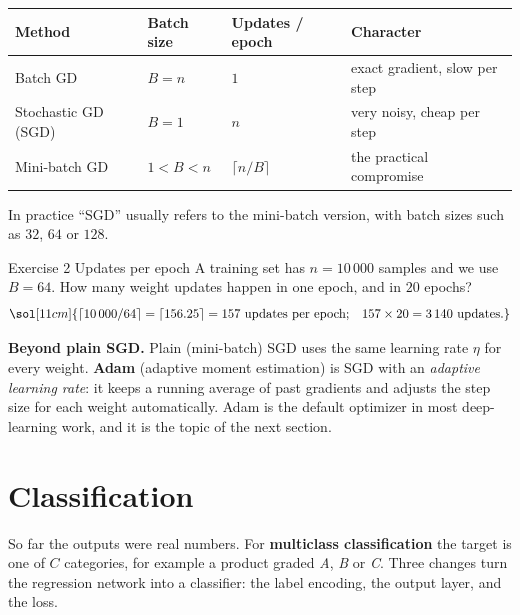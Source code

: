 \documentclass[12pt, a4paper]{article}
\begin{document}
\begin{center}
  \renewcommand{\arraystretch}{1.3}
  \begin{tabular}{llll}
    \toprule
    Method              & Batch size  & Updates / epoch     & Character                     \\
    \midrule
    Batch GD            & $B = n$     & $1$                 & exact gradient, slow per step \\
    Stochastic GD (SGD) & $B = 1$     & $n$                 & very noisy, cheap per step    \\
    Mini-batch GD       & $1 < B < n$ & $\lceil n/B \rceil$ & the practical compromise      \\
    \bottomrule
  \end{tabular}
\end{center}

In practice ``SGD'' usually refers to the mini-batch version, with batch
sizes such as $32$, $64$ or $128$.

\begin{stepbox}{Exercise 2 \quad Updates per epoch}
  A training set has $n = 10\,000$ samples and we use $B = 64$.
  How many weight updates happen in one epoch, and in $20$ epochs?
  \[
    \sol[11cm]{\lceil 10\,000 / 64 \rceil = \lceil 156.25 \rceil = 157
      \text{ updates per epoch;}\quad 157 \times 20 = 3\,140 \text{ updates.}}
  \]
\end{stepbox}

\begin{notebox}
  \textbf{Beyond plain SGD.} Plain (mini-batch) SGD uses the same learning
  rate $\eta$ for every weight. \textbf{Adam} (adaptive moment estimation)
  is SGD with an \emph{adaptive learning rate}: it keeps a running average of
  past gradients and adjusts the step size for each weight automatically.
  Adam is the default optimizer in most deep-learning work, and it is the
  topic of the next section.
\end{notebox}

\section{Classification}

So far the outputs were real numbers. For \textbf{multiclass classification}
the target is one of $C$ categories, for example a product graded
\emph{A}, \emph{B} or \emph{C}. Three changes turn the regression network into
a classifier: the label encoding, the output layer, and the loss.
\end{document}
